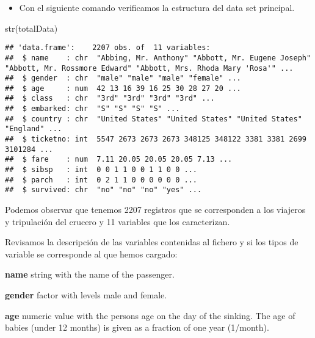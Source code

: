 \documentclass[
]{article}
\newenvironment{Shaded}{\begin{snugshade}}{\end{snugshade}}
\newcommand{\FunctionTok}[1]{\textcolor[rgb]{0.94,0.94,0.56}{#1}}
\newcommand{\NormalTok}[1]{\textcolor[rgb]{0.80,0.80,0.80}{#1}}
\newcommand{\OtherTok}[1]{\textcolor[rgb]{0.94,0.94,0.56}{#1}}
\newcommand{\SpecialCharTok}[1]{\textcolor[rgb]{0.86,0.64,0.64}{#1}}
\newcommand{\StringTok}[1]{\textcolor[rgb]{0.80,0.58,0.58}{#1}}
\providecommand{\tightlist}{%
  \setlength{\itemsep}{0pt}\setlength{\parskip}{0pt}}
\begin{document}
\begin{Shaded}
\end{Shaded}

\begin{itemize}
\tightlist
\item
  Con el siguiente comando verificamos la estructura del data set
  principal.
\end{itemize}

\begin{Shaded}
\begin{Highlighting}[]
\FunctionTok{str}\NormalTok{(totalData)}
\end{Highlighting}
\end{Shaded}

\begin{verbatim}
## 'data.frame':    2207 obs. of  11 variables:
##  $ name    : chr  "Abbing, Mr. Anthony" "Abbott, Mr. Eugene Joseph" "Abbott, Mr. Rossmore Edward" "Abbott, Mrs. Rhoda Mary 'Rosa'" ...
##  $ gender  : chr  "male" "male" "male" "female" ...
##  $ age     : num  42 13 16 39 16 25 30 28 27 20 ...
##  $ class   : chr  "3rd" "3rd" "3rd" "3rd" ...
##  $ embarked: chr  "S" "S" "S" "S" ...
##  $ country : chr  "United States" "United States" "United States" "England" ...
##  $ ticketno: int  5547 2673 2673 2673 348125 348122 3381 3381 2699 3101284 ...
##  $ fare    : num  7.11 20.05 20.05 20.05 7.13 ...
##  $ sibsp   : int  0 0 1 1 0 0 1 1 0 0 ...
##  $ parch   : int  0 2 1 1 0 0 0 0 0 0 ...
##  $ survived: chr  "no" "no" "no" "yes" ...
\end{verbatim}

Podemos observar que tenemos 2207 registros que se corresponden a los
viajeros y tripulación del crucero y 11 variables que los caracterizan.

Revisamos la descripción de las variables contenidas al fichero y si los
tipos de variable se corresponde al que hemos cargado:

\textbf{name} string with the name of the passenger.

\textbf{gender} factor with levels male and female.

\textbf{age} numeric value with the persons age on the day of the
sinking. The age of babies (under 12 months) is given as a fraction of
one year (1/month).
\end{document}
